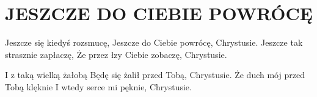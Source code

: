 \documentclass[../../../songbook.tex]{subfiles}
\begin{document}
\TabPositions{8cm} %
\section*{JESZCZE DO CIEBIE POWRÓCĘ}
\vspace{0.5cm}
Jeszcze się kiedyś rozsmucę,					 \newline
Jeszcze do Ciebie powrócę, Chrystusie.			 \newline
Jeszcze tak strasznie zapłaczę,					 \newline
Że przez łzy Ciebie zobaczę, Chrystusie.		 \newline

\-\hspace{1cm} I z taką wielką żałobą			\newline
\-\hspace{1cm} Będę się żalił przed Tobą, Chrystusie.	\newline
\-\hspace{1cm} Że duch mój przed Tobą klęknie			\newline
\-\hspace{1cm} I wtedy serce mi pęknie, Chrystusie.	\newline
\end{document}
